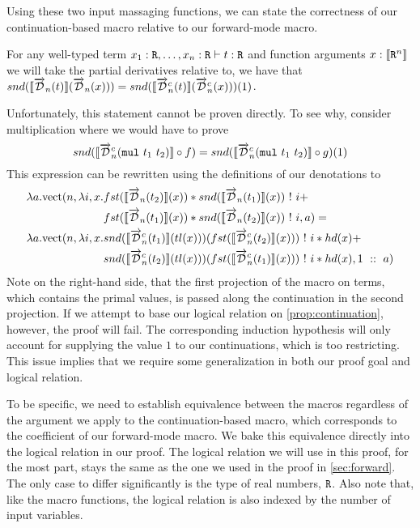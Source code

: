   Using these two input massaging functions, we can state the correctness of our continuation-based macro relative to our forward-mode macro.
  \begin{proposition}\label{prop:continuation}
    For any well-typed term $x_1 : \texttt{R}, \dots, x_n : \texttt{R} \vdash t : \texttt{R}$ and function arguments $x : \llbracket \texttt{R}^n \rrbracket$ we will take the partial derivatives relative to, we have that $snd(\llbracket\overrightarrow{\mathcal{D}}_n(t)\rrbracket (\overrightarrow{\mathcal{D}}_n(x))) = snd(\llbracket\overrightarrow{\mathcal{D}}^c_n(t)\rrbracket (\overrightarrow{\mathcal{D}}^c_n(x)))(1)$.
  \end{proposition}
  Unfortunately, this statement cannot be proven directly.
  To see why, consider multiplication where we would have to prove
  \begin{equation*}
    snd(\llbracket \overrightarrow{\mathcal{D}}^c_n(\texttt{mul}\ t_1\ t_2) \rrbracket \circ f)= snd(\llbracket \overrightarrow{\mathcal{D}}^c_n(\texttt{mul}\ t_1\ t_2) \rrbracket \circ g)(1)
  \end{equation*}
  This expression can be rewritten using the definitions of our denotations to
  \begin{align*}
    \lambda a. \text{vect}(n, \lambda i, x. &fst(\llbracket \overrightarrow{\mathcal{D}}_n(t_2) \rrbracket(x)) * snd(\llbracket \overrightarrow{\mathcal{D}}_n(t_1)\rrbracket(x))\ !\ i + \\
      &fst(\llbracket \overrightarrow{\mathcal{D}}_n(t_1) \rrbracket(x)) * snd(\llbracket \overrightarrow{\mathcal{D}}_n(t_2)\rrbracket(x))\ !\ i, a) = \\
    \lambda a. \text{vect}(n, \lambda i, x. &snd(\llbracket \overrightarrow{\mathcal{D}}^c_n(t_1) \rrbracket(tl(x)))(fst(\llbracket \overrightarrow{\mathcal{D}}^c_n(t_2)\rrbracket(x)))\ !\ i * hd(x) + \\
    &snd(\llbracket \overrightarrow{\mathcal{D}}^c_n(t_2) \rrbracket(tl(x)))(fst(\llbracket \overrightarrow{\mathcal{D}}^c_n(t_1)\rrbracket(x)))\ !\ i * hd(x), 1\ ::\ a)
  \end{align*}
  Note on the right-hand side, that the first projection of the macro on terms, which contains the primal values, is passed along the continuation in the second projection.
  If we attempt to base our logical relation on \cref{prop:continuation}, however, the proof will fail.
  The corresponding induction hypothesis will only account for supplying the value $1$ to our continuations, which is too restricting.
  This issue implies that we require some generalization in both our proof goal and logical relation.

  To be specific, we need to establish equivalence between the macros regardless of the argument we apply to the continuation-based macro, which corresponds to the coefficient of our forward-mode macro.
  We bake this equivalence directly into the logical relation in our proof.
  The logical relation we will use in this proof, for the most part, stays the same as the one we used in the proof in \cref{sec:forward}.
  The only case to differ significantly is the type of real numbers, $\texttt{R}$.
  Also note that, like the macro functions, the logical relation is also indexed by the number of input variables.

